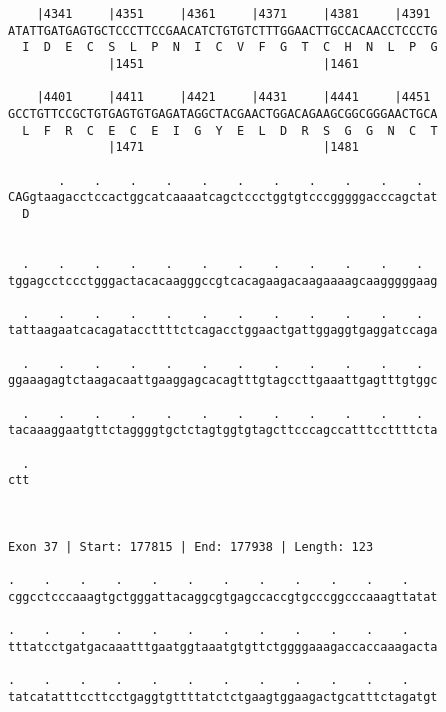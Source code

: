 \documentclass{article}
\begin{document}
\begin{Verbatim}
    |4341     |4351     |4361     |4371     |4381     |4391 
ATATTGATGAGTGCTCCCTTCCGAACATCTGTGTCTTTGGAACTTGCCACAACCTCCCTG
  I  D  E  C  S  L  P  N  I  C  V  F  G  T  C  H  N  L  P  G
              |1451                         |1461           
  
    |4401     |4411     |4421     |4431     |4441     |4451 
GCCTGTTCCGCTGTGAGTGTGAGATAGGCTACGAACTGGACAGAAGCGGCGGGAACTGCA
  L  F  R  C  E  C  E  I  G  Y  E  L  D  R  S  G  G  N  C  T
              |1471                         |1481           
  
       .    .    .    .    .    .    .    .    .    .    .  
CAGgtaagacctccactggcatcaaaatcagctccctggtgtcccgggggacccagctat
  D                                                         
                                                            
  
  .    .    .    .    .    .    .    .    .    .    .    .  
tggagcctccctgggactacacaagggccgtcacagaagacaagaaaagcaagggggaag
                                                            
  .    .    .    .    .    .    .    .    .    .    .    .  
tattaagaatcacagataccttttctcagacctggaactgattggaggtgaggatccaga
                                                            
  .    .    .    .    .    .    .    .    .    .    .    .  
ggaaagagtctaagacaattgaaggagcacagtttgtagccttgaaattgagtttgtggc
                                                            
  .    .    .    .    .    .    .    .    .    .    .    .  
tacaaaggaatgttctaggggtgctctagtggtgtagcttcccagccatttccttttcta
                                                            
  .
ctt
   
   
 
Exon 37 | Start: 177815 | End: 177938 | Length: 123
 
.    .    .    .    .    .    .    .    .    .    .    .    
cggcctcccaaagtgctgggattacaggcgtgagccaccgtgcccggcccaaagttatat
                                                            
.    .    .    .    .    .    .    .    .    .    .    .    
tttatcctgatgacaaatttgaatggtaaatgtgttctggggaaagaccaccaaagacta
                                                            
.    .    .    .    .    .    .    .    .    .    .    .    
tatcatatttccttcctgaggtgttttatctctgaagtggaagactgcatttctagatgt
                                                            

\end{Verbatim}
\end{document}
